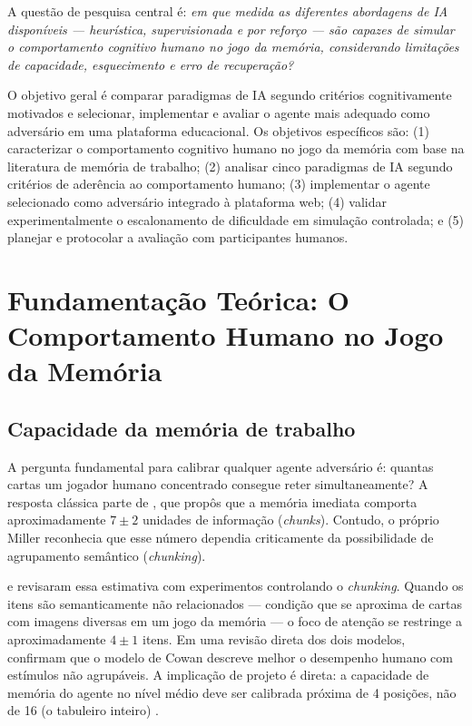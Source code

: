 \documentclass[
    12pt,
    openright,
    twoside,
    a4paper,
    english,
    brazil
]{abntex2}
\begin{document}
A questão de pesquisa central é: \textit{em que medida as diferentes abordagens de IA disponíveis — heurística, supervisionada e por reforço — são capazes de simular o comportamento cognitivo humano no jogo da memória, considerando limitações de capacidade, esquecimento e erro de recuperação?}

O objetivo geral é comparar paradigmas de IA segundo critérios cognitivamente motivados e selecionar, implementar e avaliar o agente mais adequado como adversário em uma plataforma educacional. Os objetivos específicos são: (1) caracterizar o comportamento cognitivo humano no jogo da memória com base na literatura de memória de trabalho; (2) analisar cinco paradigmas de IA segundo critérios de aderência ao comportamento humano; (3) implementar o agente selecionado como adversário integrado à plataforma web; (4) validar experimentalmente o escalonamento de dificuldade em simulação controlada; e (5) planejar e protocolar a avaliação com participantes humanos.

\chapter{Fundamentação Teórica: O Comportamento Humano no Jogo da Memória}

\section{Capacidade da memória de trabalho}

A pergunta fundamental para calibrar qualquer agente adversário é: quantas cartas um jogador humano concentrado consegue reter simultaneamente? A resposta clássica parte de , que propôs que a memória imediata comporta aproximadamente $7 \pm 2$ unidades de informação (\textit{chunks}). Contudo, o próprio Miller reconhecia que esse número dependia criticamente da possibilidade de agrupamento semântico (\textit{chunking}).

 e  revisaram essa estimativa com experimentos controlando o \textit{chunking}. Quando os itens são semanticamente não relacionados — condição que se aproxima de cartas com imagens diversas em um jogo da memória — o foco de atenção se restringe a aproximadamente $4 \pm 1$ itens. Em uma revisão direta dos dois modelos,  confirmam que o modelo de Cowan descreve melhor o desempenho humano com estímulos não agrupáveis. A implicação de projeto é direta: a capacidade de memória do agente no nível médio deve ser calibrada próxima de 4 posições, não de 16 (o tabuleiro inteiro) \cite{cowan2001}.
\end{document}
